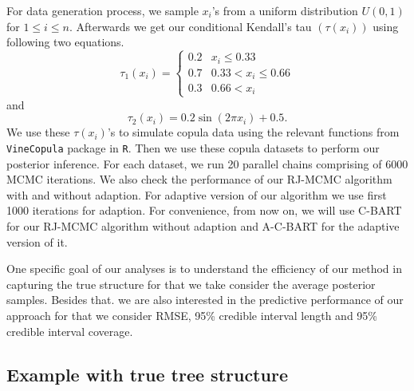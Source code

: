 \documentclass{amsart}
\begin{document}
For data generation process, we sample $x_i$'s from a uniform distribution $U(0,1)$ for $1\le i\le n$. Afterwards we get our conditional Kendall's tau $(\tau(x_i))$ using following two equations.
\begin{equation}\label{eq:tree:tau}
	\tau_1(x_i) = \begin{cases}
		0.2 & x_i \le 0.33\\
		0.7 & 0.33 < x_i \le 0.66\\
		0.3 & 0.66 < x_i
	\end{cases}
\end{equation}
and
\begin{equation}\label{eq:sin:tau}
	\tau_2(x_i) = 0.2\sin(2\pi x_i) + 0.5.
\end{equation}
We use these $\tau(x_i)$'s to simulate copula data using the relevant functions from \texttt{VineCopula} package in \texttt{R}. Then we use these copula datasets to perform our posterior inference. For each dataset, we run 20 parallel chains comprising of 6000 MCMC iterations. We also check the performance of our RJ-MCMC algorithm with and without adaption. For adaptive version of our algorithm we use first 1000 iterations for adaption. For convenience, from now on, we will use C-BART for our RJ-MCMC algorithm without adaption and A-C-BART for the adaptive version of it.

One specific goal of our analyses is to understand the efficiency of our method in capturing the true structure for that we take consider the average posterior samples. Besides that. we are also interested in the predictive performance of our approach for that we consider RMSE, 95\% credible interval length and 95\% credible interval coverage. 

\subsection{Example with true tree structure} 
\end{document}
